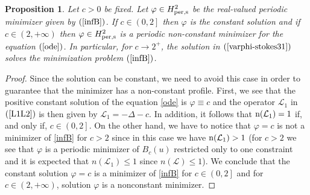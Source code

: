 \documentclass[12pt,reqno,a4paper]{amsart} %
\numberwithin{equation}{section}
\numberwithin{figure}{section}
\newtheorem{proposition}[theorem]{Proposition}
\begin{document}
\begin{proposition}\label{theorem1even}
	Let $c>0$ be fixed. Let $\varphi \in H^2_{\rm per,s}$ be the real-valued periodic minimizer  given by $(\ref{infB})$. If $c \in \left(0, 2\right]$ then $\varphi$ is the constant solution and if $c \in \left(2, +\infty \right)$ then $\varphi\in H^2_{\rm per,s}$ is a periodic non-constant minimizer for the equation $(\ref{ode})$. In particular, for $c\rightarrow2^{+}$, the solution in $(\ref{varphi-stokes31})$ solves the minimization problem $(\ref{infB})$.
\end{proposition}
\begin{proof}
	\indent Since the solution can be constant, we need to avoid this case in order to guarantee that the minimizer has a non-constant profile. First, we see that the positive constant solution of the equation \eqref{ode} is $\varphi\equiv c$ and the operator  $\mathcal{L}_1$ in $(\ref{L1L2})$ is then given by
	$
	\mathcal{L}_1= -\Delta-c.
	$
	In addition, it follows that ${\rm n}(\mathcal{L}_1)=1$ if, and only if, $c \in \left(0, 2\right]$. On the other hand, we have to notice that $\varphi = c$ is not a minimizer of \eqref{infB} for $c > 2$ since in this case we have ${\rm n}(\mathcal{L}_1) > 1$ (for $c>2$ we see that $\varphi$ is a periodic minimizer of $B_c(u)$ restricted only to one constraint and it is expected that $n(\mathcal{L}_1)\leq1$ since $n(\mathcal{L})\leq1$). We conclude that the constant solution $\varphi=c$ is a minimizer of \eqref{infB} for $c\in \left(0, 2\right]$ and for $c \in \left(2, +\infty \right)$, solution  $\varphi$ is a nonconstant minimizer.
\end{proof}
	
	
		
\end{document}
